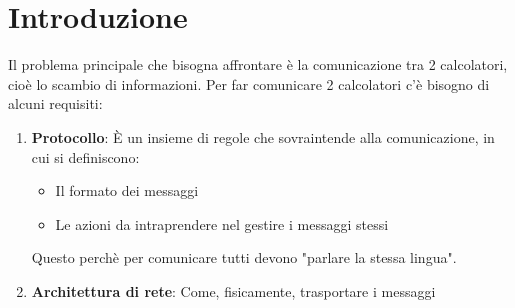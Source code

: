\documentclass[a4paper]{article}
\begin{document}


\tableofcontents
\pagebreak

%
%
%
%
\section{Introduzione}
Il problema principale che bisogna affrontare è la comunicazione tra 2 calcolatori,
cioè lo scambio di informazioni. Per far comunicare 2 calcolatori c'è bisogno di
alcuni requisiti:
\begin{enumerate}
  \item \textbf{Protocollo}: È un insieme di regole che sovraintende alla comunicazione,
    in cui si definiscono:
    \begin{itemize}
      \item Il formato dei messaggi
      \item Le azioni da intraprendere nel gestire i messaggi stessi
    \end{itemize}
    Questo perchè per comunicare tutti devono "parlare la stessa lingua".

  \item \textbf{Architettura di rete}: Come, fisicamente, trasportare i messaggi
\end{enumerate}
\end{document}
